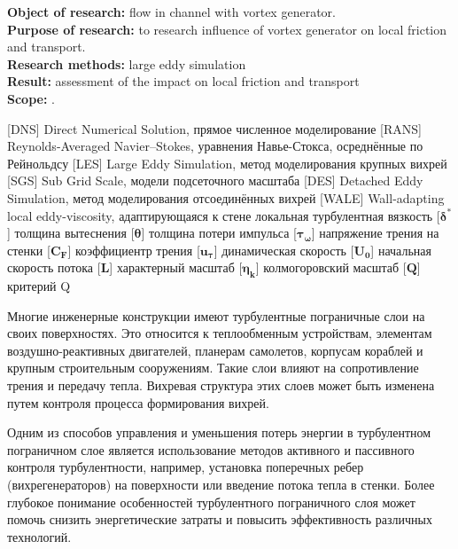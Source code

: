 \textbf{Object of research:} flow in channel with vortex generator.\\
\textbf{Purpose of research:} to research influence of vortex generator on local friction and transport.\\
\textbf{Research methods:} large eddy simulation\\
\textbf{Result:} assessment of the impact on local friction and transport\\
\textbf{Scope:} .\\
\newpage
{}
\begin{acronym}[RANS]
	   [DNS]   {Direct Numerical Solution, прямое численное моделирование}
	  [RANS]  {Reynolds-Averaged Navier–Stokes, уравнения Навье-Стокса, осреднённые по Рейнольдсу}
	   [LES]   {Large Eddy Simulation, метод моделирования крупных вихрей}
	   [SGS]   {Sub Grid Scale, модели подсеточного масштаба}
	   [DES]   {Detached Eddy Simulation, метод моделирования отсоединённых вихрей}
	  [WALE]  {Wall-adapting local eddy-viscosity, адаптирующаяся к стене локальная турбулентная вязкость}
	 [$\boldsymbol{\delta^*}$] {толщина вытеснения}
	 [$\boldsymbol{\theta}$] {толщина потери импульса}
	 [$\boldsymbol{\tau_\omega}$] {напряжение трения на стенки}
	 [$\boldsymbol{C_F}$] {коэффициентр трения}
	 [$\boldsymbol{u_\tau}$] {динамическая скорость}
	 [$\boldsymbol{U_0}$] {начальная скорость потока}
	  [$\boldsymbol{L}$] {характерный масштаб}
	 [$\boldsymbol{\eta_k}$] {колмогоровский масштаб}
	 [$\boldsymbol{Q}$] {критерий Q}
\end{acronym}
\newpage
{}
	
	‍Многие инженерные конструкции имеют турбулентные пограничные слои на своих поверхностях. Это относится к теплообменным устройствам, элементам воздушно-реактивных двигателей, планерам самолетов, корпусам кораблей и крупным строительным сооружениям. Такие слои влияют на сопротивление трения и передачу тепла. Вихревая структура этих слоев может быть изменена путем контроля процесса формирования вихрей.
	
	Одним из способов управления и уменьшения потерь энергии в турбулентном пограничном слое является использование методов активного и пассивного контроля турбулентности, например, установка поперечных ребер (вихрегенераторов) на поверхности или введение потока тепла в стенки. Более глубокое понимание особенностей турбулентного пограничного слоя может помочь снизить энергетические затраты и повысить эффективность различных технологий.
	
